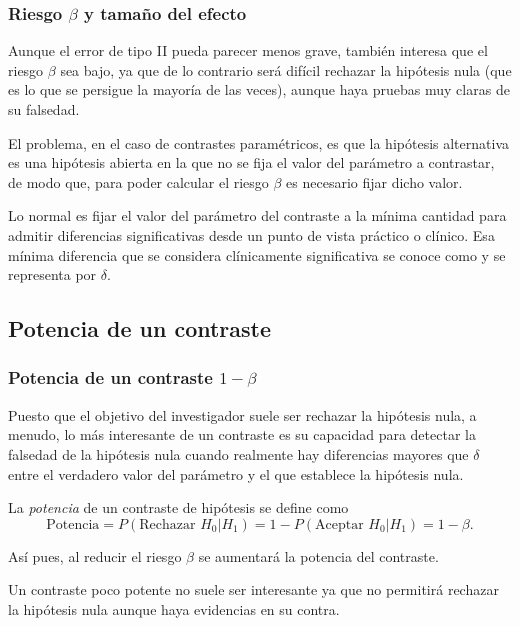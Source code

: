 \begin{frame}
\frametitle{Riesgo $\beta$ y tamaño del efecto}
Aunque el error de tipo II pueda parecer menos grave, también interesa que el riesgo $\beta$ sea bajo, ya que de lo contrario será difícil rechazar la hipótesis nula (que es lo que se persigue la mayoría de las veces), aunque haya pruebas muy claras de su falsedad.

El problema, en el caso de contrastes paramétricos, es que la hipótesis alternativa es una hipótesis abierta en la que no se fija el valor del parámetro a contrastar, de modo que, para poder calcular el riesgo $\beta$ es necesario fijar dicho valor.

Lo normal es fijar el valor del parámetro del contraste a la mínima cantidad para admitir diferencias significativas desde un punto de vista práctico o clínico. 
Esa mínima diferencia que se considera clínicamente significativa se conoce como  y se representa por $\delta$.
\end{frame}


\subsection{Potencia de un contraste}
\begin{frame}
\frametitle{Potencia de un contraste $1-\beta$}
Puesto que el objetivo del investigador suele ser rechazar la hipótesis nula, a menudo, lo más interesante de un contraste es su capacidad para detectar la falsedad de la hipótesis nula cuando realmente hay diferencias mayores que $\delta$ entre el verdadero valor del parámetro y el que establece la hipótesis nula.

\begin{definicion}
La \emph{potencia} de un contraste de hipótesis se define como
\[
\text{Potencia} = P(\text{Rechazar }H_0|H_1) = 1 - P(\text{Aceptar }H_0|H_1) = 1-\beta.
\]
\end{definicion}

Así pues, al reducir el riesgo $\beta$ se aumentará la potencia del contraste.

Un contraste poco potente no suele ser interesante ya que no permitirá rechazar la hipótesis nula aunque haya evidencias en su contra.
\end{frame}


